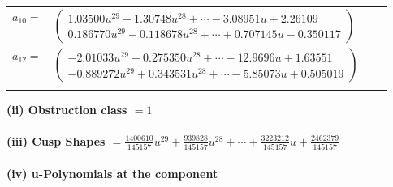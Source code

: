 \documentclass[1p]{elsarticle_modified}
\theoremstyle{definition}
\begin{document}
\begin{tabular}{m{7pt} m{180pt} m{7pt} m{180pt} }
\flushright $a_{10}=$&$\begin{pmatrix}1.03500 u^{29}+1.30748 u^{28}+\cdots-3.08951 u+2.26109\\0.186770 u^{29}-0.118678 u^{28}+\cdots+0.707145 u-0.350117\end{pmatrix}$ \\
\flushright $a_{12}=$&$\begin{pmatrix}-2.01033 u^{29}+0.275350 u^{28}+\cdots-12.9696 u+1.63551\\-0.889272 u^{29}+0.343531 u^{28}+\cdots-5.85073 u+0.505019\end{pmatrix}$\\&\end{tabular}
\flushleft \textbf{(ii) Obstruction class $= 1$}\\~\\
\flushleft \textbf{(iii) Cusp Shapes $= \frac{1400610}{145157} u^{29}+\frac{939828}{145157} u^{28}+\cdots+\frac{3223212}{145157} u+\frac{2462379}{145157}$}\\~\\
\newpage\renewcommand{\arraystretch}{1}
\flushleft \textbf{(iv) u-Polynomials at the component}\newline \\
\end{document}

